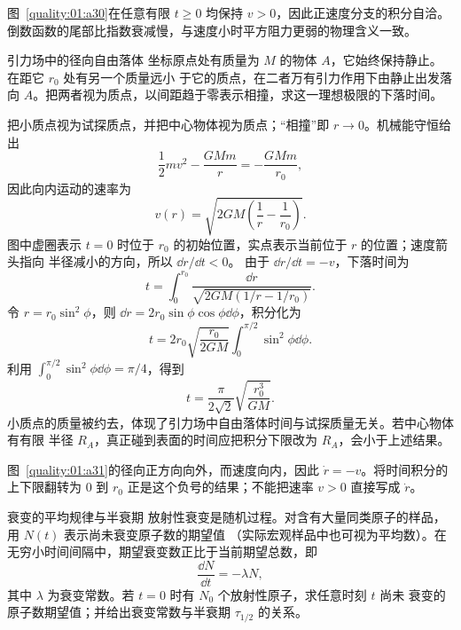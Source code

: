 {\begin{xesolution}

图~\ref{quality:01:a30}在任意有限 $t\ge0$ 均保持 $v>0$，因此正速度分支的积分自洽。倒数函数的尾部比指数衰减慢，与速度小时平方阻力更弱的物理含义一致。
\end{xesolution}

\begin{origexamplebox}{引力场中的径向自由落体}\label{ch01:ex:s15-1-26}
坐标原点处有质量为 $M$ 的物体 $A$，它始终保持静止。在距它 $r_0$ 处有另一个质量远小
于它的质点，在二者万有引力作用下由静止出发落向 $A$。把两者视为质点，以间距趋于零表示相撞，求这一理想极限的下落时间。

\end{origexamplebox}

\begin{xesolution}
把小质点视为试探质点，并把中心物体视为质点；“相撞”即 $r\to0$。机械能守恒给出
\[
 \frac12mv^2-\frac{GMm}{r}=-\frac{GMm}{r_0},
\]
因此向内运动的速率为
\[
 v(r)=\sqrt{2GM\left(\frac1r-\frac1{r_0}\right)}.
\]
图中虚圈表示 $t=0$ 时位于 $r_0$ 的初始位置，实点表示当前位于 $r$ 的位置；速度箭头指向
半径减小的方向，所以 $\dd r/\dd t<0$。
由于 $\dd r/\dd t=-v$，下落时间为
\[
 t=\int_0^{r_0}\frac{\dd r}
 {\sqrt{2GM(1/r-1/r_0)}}.
\]
令 $r=r_0\sin^2\phi$，则 $\dd r=2r_0\sin\phi\cos\phi\dd\phi$，积分化为
\[
 t=2r_0\sqrt{\frac{r_0}{2GM}}
 \int_0^{\pi/2}\sin^2\phi\dd\phi.
\]
利用 $\int_0^{\pi/2}\sin^2\phi\dd\phi=\pi/4$，得到
\[
 \boxed{t=\frac{\pi}{2\sqrt2}
 \sqrt{\frac{r_0^3}{GM}}}.
\]
小质点的质量被约去，体现了引力场中自由落体时间与试探质量无关。若中心物体有有限
半径 $R_A$，真正碰到表面的时间应把积分下限改为 $R_A$，会小于上述结果。

图~\ref{quality:01:a31}的径向正方向向外，而速度向内，因此 $\dot r=-v$。将时间积分的上下限翻转为 $0$ 到 $r_0$ 正是这个负号的结果；不能把速率 $v>0$ 直接写成 $\dot r$。
\end{xesolution}

\begin{origexamplebox}{衰变的平均规律与半衰期}\label{ch01:ex:s15-1-27}
放射性衰变是随机过程。对含有大量同类原子的样品，用 $N(t)$ 表示尚未衰变原子数的期望值
（实际宏观样品中也可视为平均数）。在无穷小时间间隔中，期望衰变数正比于当前期望总数，即
\[
 \frac{\dd N}{\dd t}=-\lambda N,
\]
其中 $\lambda$ 为衰变常数。若 $t=0$ 时有 $N_0$ 个放射性原子，求任意时刻 $t$ 尚未
衰变的原子数期望值；并给出衰变常数与半衰期 $\tau_{1/2}$ 的关系。


\end{origexamplebox}}
